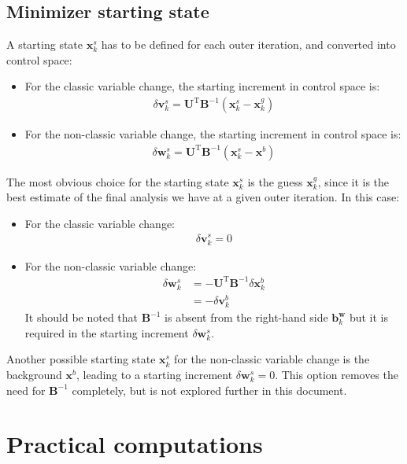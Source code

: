 \documentclass[12pt]{scrartcl}
\begin{document}
\subsection{Minimizer starting state}
A starting state $\mathbf{x}^s_k$ has to be defined for each outer iteration, and converted into control space:
\begin{itemize}
\item For the classic variable change, the starting increment in control space is:
\begin{align}
\delta \mathbf{v}^s_k = \mathbf{U}^\mathrm{T} \mathbf{B}^{-1} \left(\mathbf{x}^s_k-\mathbf{x}^g_k\right)
\end{align}
\item For the non-classic variable change, the starting increment in control space is:
\begin{align}
\delta \mathbf{w}^s_k = \mathbf{U}^\mathrm{T} \mathbf{B}^{-1} \left(\mathbf{x}^s_k-\mathbf{x}^b\right)
\end{align}
\end{itemize}
The most obvious choice for the starting state $\mathbf{x}^s_k$ is the guess $\mathbf{x}^g_k$, since it is the best estimate of the final analysis we have at a given outer iteration. In this case:
\begin{itemize}
\item For the classic variable change:
\begin{align}
\delta \mathbf{v}^s_k = 0
\end{align}
\item For the non-classic variable change:
\begin{align}
\delta \mathbf{w}^s_k & = -\mathbf{U}^\mathrm{T} \mathbf{B}^{-1} \delta \mathbf{x}^b_k \nonumber \\
& = - \delta \mathbf{v}^b_k
\end{align}
It should be noted that $\mathbf{B}^{-1}$ is absent from the right-hand side $\mathbf{b}^\mathbf{w}_k$ but it is required in the starting increment $\delta \mathbf{w}^s_k$.
\end{itemize}
Another possible starting state $\mathbf{x}^s_k$ for the non-classic variable change is the background $\mathbf{x}^b$, leading to a starting increment $\delta \mathbf{w}^s_k = 0$. This option removes the need for $\mathbf{B}^{-1}$ completely, but is not explored further in this document.

\section{Practical computations}
\end{document}
